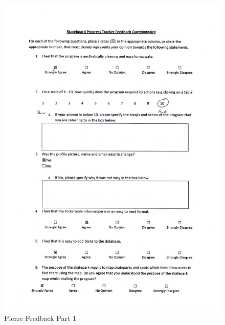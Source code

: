 \begin{itemize}
\begin{figure}[H]
    \includegraphics[width=\textwidth]{./Evaluation/images/PierreFeedback1.pdf}
    \caption{Pierre Feedback Part 1} \label{fig:PierreFeedback1}
\end{figure}


\end{itemize}
